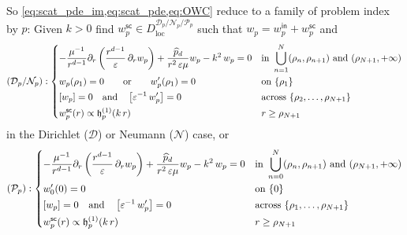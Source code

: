\documentclass[12pt,a4paper]{article}
\theoremstyle{definition}
\theoremstyle{plain}
\theoremstyle{remark}
\newcommand{\calD}{\mathcal{D}}
\newcommand{\calN}{\mathcal{N}}
\newcommand{\calP}{\mathcal{P}}
\newcommand{\frh}{\mathop{}\!\mathfrak{h}^{(1)}}
\newcommand{\plr}[1]{\left(#1\right)}
\newcommand{\clr}[1]{\left[#1\right]}
\newcommand{\eps}{\varepsilon}
\newcommand{\loc}{\mathrm{loc}}
\newcommand{\inc}{\mathsf{in}}
\newcommand{\sca}{\mathsf{sc}}
\begin{document}
So \cref{eq:scat_pde_im,eq:scat_pde,eq:OWC} reduce to a family of problem index by $p$: Given $k > 0$ find $w_p^\sca \in D^{\calD_p/\calN_p/\calP_p}_\loc$ such that $w_p = w_p^\inc + w_p^\sca$ and
\begin{equation}
    (\calD_p/\calN_p) : \begin{dcases}
        -\frac{\mu^{-1}}{r^{d-1}} \partial_r\plr{\frac{r^{d-1}}{\eps}\, \partial_r w_p} + \dfrac{\widehat{p}_d}{r^2\, \eps\mu} w_p - k^2\, w_p = 0 & \text{in } \bigcup_{n=1}^N (\rho_n, \rho_{n+1}) \text{ and } (\rho_{N+1}, +\infty) \\
        w_p(\rho_1) = 0 \qquad \text{or} \qquad w_p'(\rho_1) = 0                                                                                   & \text{on } \{\rho_1\}                                                              \\
        \clr{w_p} = 0 \quad\text{and}\quad \clr{\eps^{-1}\, w_p'} = 0                                                                              & \text{across } \{\rho_2, \ldots, \rho_{N+1}\}                                      \\
        w_p^\sca(r) \propto \frh_p(k\, r)                                                                                                          & r \ge \rho_{N+1}
    \end{dcases}
\end{equation}
in the Dirichlet ($\calD$) or Neumann ($\calN$) case, or
\begin{equation}
    (\calP_p) : \begin{dcases}
        -\frac{\mu^{-1}}{r^{d-1}} \partial_r\plr{\frac{r^{d-1}}{\eps}\, \partial_r w_p} + \dfrac{\widehat{p}_d}{r^2\, \eps\mu} w_p - k^2\, w_p = 0 & \text{in } \bigcup_{n=0}^N (\rho_n, \rho_{n+1}) \text{ and } (\rho_{N+1}, +\infty) \\
        w_0'(0) = 0                                                                                                                                & \text{on } \{0\}                                                                   \\
        \clr{w_p} = 0 \quad\text{and}\quad \clr{\eps^{-1}\, w_p'} = 0                                                                              & \text{across } \{\rho_1, \ldots, \rho_{N+1}\}                                      \\
        w_p^\sca(r) \propto \frh_p(k\, r)                                                                                                          & r \ge \rho_{N+1}
    \end{dcases}
\end{equation}
\end{document}
